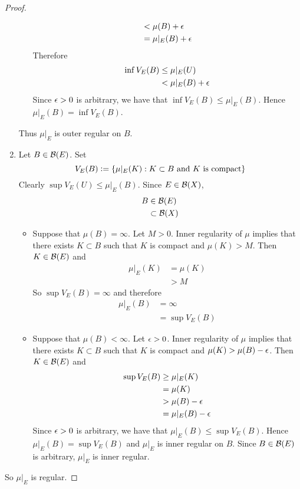 \documentclass{book}
\begin{document}
\begin{proof}
\begin{enumerate}
\begin{itemize}
\begin{align*}
					& < \mu(B) + \epsilon \\
					& = \mu|_E(B) + \epsilon
				\end{align*}
				Therefore
				\begin{align*}
					\inf V_E(B)
					& \leq \mu|_E(U) \\
					& < \mu|_E(B) + \epsilon
				\end{align*}
				Since $\epsilon > 0$ is arbitrary, we have that $\inf V_E(B) \leq \mu|_E(B)$. Hence $\mu|_E(B) = \inf V_E(B)$.
			\end{itemize}
			Thus $\mu|_E$ is outer regular on $B$.
			\item Let $B \in \mathcal{B}(E)$.  Set 
			$$V_E(B) \vcentcolon= \{\mu|_E(K): K \subset B \text{ and $K$ is compact}\}$$
			Clearly $\sup V_E(U) \leq \mu|_E(B)$. Since $E \in \mathcal{B}(X)$, 
			\begin{align*}
				B
				& \in \mathcal{B}(E) \\
				& \subset \mathcal{B}(X)
			\end{align*}
			\begin{itemize}
				\item Suppose that $\mu(B) = \infty$. Let $M >0$. Inner regularity of $\mu$ implies that there exists $K \subset B$ such that $K$ is compact and $\mu(K) > M$. Then $K \in \mathcal{B}(E)$ and
				\begin{align*}
					\mu|_E(K)
					& = \mu(K) \\
					& > M
				\end{align*}
				So $\sup V_E(B) = \infty$ and therefore
				\begin{align*}
					\mu|_E(B) 
					& = \infty \\ 
					& = \sup V_E(B)
				\end{align*} 
				\item Suppose that $\mu(B) < \infty$. Let $\epsilon > 0$. Inner regularity of $\mu$ implies that there exists $K \subset B$ such that $K$ is compact and $\mu(K) > \mu(B) - \epsilon$. Then $K \in \mathcal{B}(E)$ and
				\begin{align*}
					\sup V_E(B)
					& \geq \mu|_E(K) \\
					& = \mu(K) \\
					& > \mu(B) - \epsilon \\
					& = \mu|_E(B) - \epsilon 
				\end{align*}
				Since $\epsilon >0$ is arbitrary, we have that $\mu|_E(B) \leq \sup V_E(B)$. Hence $\mu|_E(B) = \sup V_E(B)$ and $\mu|_E$ is inner regular on $B$. Since $B \in \mathcal{B}(E)$ is arbitrary, $\mu|_E$ is inner regular.
			\end{itemize}
			\end{enumerate}
			So $\mu|_E$ is regular.
	\end{proof}
\end{document}
